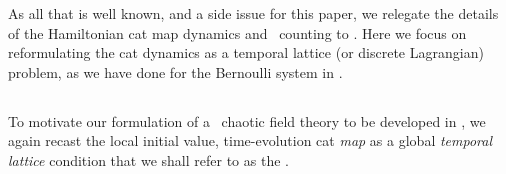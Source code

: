As all that is well known, and a side issue for this paper, we relegate
the details of the Hamiltonian cat map dynamics and \po\ counting to
. Here we focus on reformulating the cat dynamics as
a temporal lattice (or discrete Lagrangian) problem, as we have done for
the Bernoulli system in .

\subsection{\tempLatt}
\label{s:catLagrange}
\renewcommand{\period}[1]{{\ensuremath{n_{#1}}}}

To motivate our formulation of a \spt\ chaotic field theory to be
developed in , we again recast the local initial
value, time-evolution cat \emph{map}  as a global
\emph{temporal lattice} condition that we shall refer to as the
{\em \templatt}.

